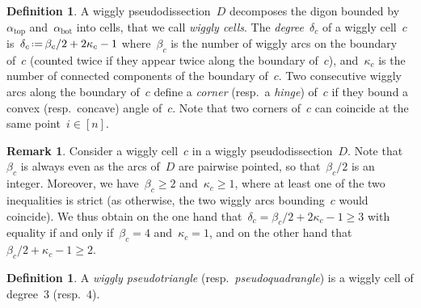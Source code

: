 \documentclass{amsart}
\theoremstyle{definition}
\newtheorem{definition}[theorem]{Definition}
\newtheorem{remark}[theorem]{Remark}
\newcommand{\eqdef}{\mbox{\,\raisebox{0.2ex}{\scriptsize\ensuremath{\mathrm:}}\ensuremath{=}\,}} %
\newcommand{\darkblue}{\color{darkblue}} %
\newcommand{\defn}[1]{\textsl{\darkblue #1}} %
\begin{document}
\begin{definition}
A wiggly pseudodissection~$D$ decomposes the digon bounded by~$\alpha_\mathrm{top}$ and~$\alpha_\mathrm{bot}$ into cells, that we call \defn{wiggly cells}.
The \defn{degree}~$\delta_c$ of a wiggly cell~$c$ is~$\delta_c \eqdef \beta_c/2+2\kappa_c-1$ where~$\beta_c$ is the number of wiggly arcs on the boundary of~$c$ (counted twice if they appear twice along the boundary of~$c$), and~$\kappa_c$ is the number of connected components of the boundary of~$c$.
Two consecutive wiggly arcs along the boundary of~$c$ define a \defn{corner} (resp.~a \defn{hinge}) of~$c$ if they bound a convex (resp.~concave) angle of~$c$.
Note that two corners of~$c$ can coincide at the same point~$i \in [n]$.
\end{definition}

\begin{remark}
\label{rem:degree}
Consider a wiggly cell~$c$ in a wiggly pseudodissection~$D$.
Note that~$\beta_c$ is always even as the arcs of~$D$ are pairwise pointed, so that~$\beta_c/2$ is an integer.
Moreover, we have~$\beta_c \ge 2$ and~$\kappa_c \ge 1$, where at least one of the two inequalities is strict (as otherwise, the two wiggly arcs bounding~$c$ would coincide).
We thus obtain on the one hand that~$\delta_c = \beta_c/2+2\kappa_c-1 \ge 3$ with equality if and only if~$\beta_c = 4$ and~$\kappa_c = 1$, and on the other hand that~$\beta_c/2+\kappa_c-1 \ge 2$.
\end{remark}

\begin{definition}
A \defn{wiggly pseudotriangle} (resp.~\defn{pseudoquadrangle}) is a wiggly cell of degree~$3$ (resp.~$4$).
\end{definition}
\end{document}
